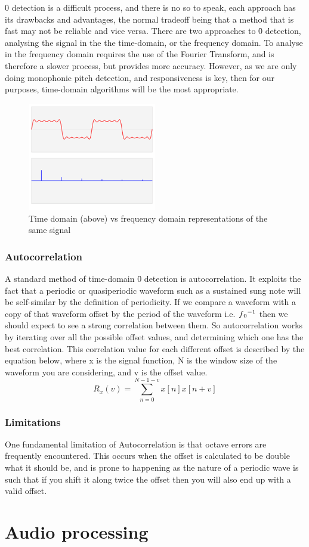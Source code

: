 	\f0 detection is a difficult process, and there is no  so to speak, each approach has its drawbacks and advantages, the normal tradeoff being that a method that is fast may not be reliable and vice versa.
	There are two approaches to \f0 detection, analysing the signal in the the time-domain, or the frequency domain. To analyse in the frequency domain requires the use of the Fourier Transform, and is therefore a slower process, but provides more accuracy. However, as we are only doing monophonic pitch detection, and responsiveness is key, then for our purposes, time-domain algorithms will be the most appropriate.
	\begin{figure}[h!]
  		\caption{Time domain (above) vs frequency domain representations of the same signal}
  		\centering
    	\includegraphics[width=0.5\textwidth]{assets/time-frequency.png}
	\end{figure}
		\subsubsection{Autocorrelation}
		A standard method of time-domain \f0 detection is autocorrelation. It exploits the fact that a periodic or quasiperiodic waveform such as a sustained sung note will be self-similar by the definition of periodicity. If we compare a waveform with a copy of that waveform offset by the period of the waveform i.e. \(\f0 ^{-1}\) then we should expect to see a strong correlation between them. So autocorrelation works by iterating over all the possible offset values, and determining which one has the best correlation. This correlation value for each different offset is described by the equation below, where x is the signal function, N is the window size of the waveform you are considering, and v is the offset value.  \[R_x(v) = \sum_{n=0}^{N-1-v} x[n]x[n+v]\]
		\subsubsection{Limitations}
		One fundamental limitation of Autocorrelation is that octave errors are frequently encountered. This occurs when the offset is calculated to be double what it should be, and is prone to happening as the nature of a periodic wave is such that if you shift it along twice the offset then you will also end up with a valid offset.
	
\section{Audio processing}
